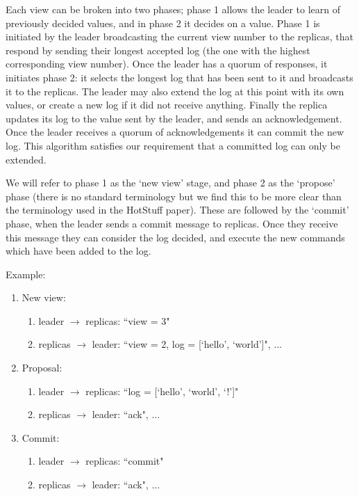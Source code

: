Each view can be broken into two phases; phase 1 allows the leader to learn of previously decided values, and in phase 2 it decides on a value. Phase 1 is initiated by the leader broadcasting the current view number to the replicas, that respond by sending their longest accepted log (the one with the highest corresponding view number). Once the leader has a quorum of responses, it initiates phase 2: it selects the longest log that has been sent to it and broadcasts it to the replicas. The leader may also extend the log at this point with its own values, or create a new log if it did not receive anything. Finally the replica updates its log to the value sent by the leader, and sends an acknowledgement. Once the leader receives a quorum of acknowledgements it can commit the new log. This algorithm satisfies our requirement that a committed log can only be extended.

We will refer to phase 1 as the `new view' stage, and phase 2 as the `propose' phase (there is no standard terminology but we find this to be more clear than the terminology used in the HotStuff paper). These are followed by the `commit' phase, when the leader sends a commit message to replicas. Once they receive this message they can consider the log decided, and execute the new commands which have been added to the log.

Example:

\begin{enumerate}
\item New view: 
	\begin{enumerate}
	\item leader $\to$ replicas: ``view = 3" 
	\item replicas $\to$ leader: ``view = 2, log = [`hello', `world']", ...
	\end{enumerate}
\item Proposal:
	\begin{enumerate}
	\item leader $\to$ replicas: ``log = [`hello', `world', `!']"
	\item replicas $\to$ leader: ``ack", ...
	\end{enumerate}
\item Commit:
	\begin{enumerate}
	\item leader $\to$ replicas: ``commit"
	\item replicas $\to$ leader: ``ack", ...
	\end{enumerate}
\end{enumerate}

